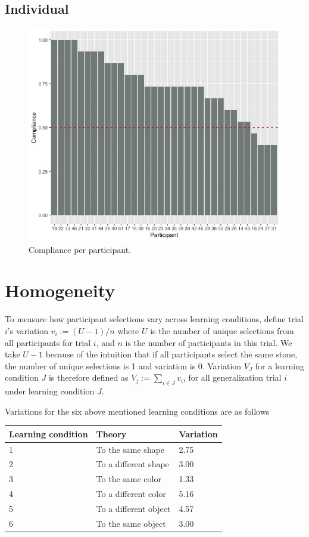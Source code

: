 \documentclass{article}
\begin{document}
\subsection{Individual}
\begin{figure}[h!]
  \centering
  \includegraphics[width=.8\linewidth]{individual_compliance} 
  \caption{Compliance per participant.} 
  \label{fig:comp_ppt}
\end{figure}


\section{Homogeneity}

To measure how participant selections vary across learning conditions, define trial $i$'s variation $v_i := (U - 1) /n $ where $U$ is the number of unique selections from all participants for trial $i$, and $n$ is the number of participants in this trial. 
We take $U - 1$ because of the intuition that if all participants select the same stone, the number of unique selections is 1 and variation is 0.
Variation $V_J$ for a learning condition $J$ is therefore defined as $V_j := \sum_{i \in J}v_i$, for all generalization trial $i$ under learning condition $J$.

Variations for the six above mentioned learning conditions are as follows

\begin{table}[h!]
\centering
\begin{tabular}{l|l|l}
Learning condition & Theory & Variation \\
\hline
1                  & To the same shape & 2.75 \\
2                  & To a different shape & 3.00 \\
3                  & To the same color & 1.33  \\
4                  & To a different color & 5.16  \\
5                  & To a different object & 4.57  \\
6                  & To the same object & 3.00  \\
\end{tabular}
\end{table}
\end{document}
